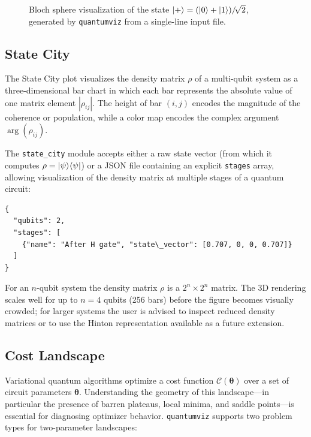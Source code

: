 \documentclass{SciPost}
\begin{document}
\begin{figure}[h]
\centering
{}
\caption{Bloch sphere visualization of the state
         $\ket{+} = (\ket{0}+\ket{1})/\!\sqrt{2}$,
         generated by \texttt{quantumviz} from a single-line input file.}
\label{fig:bloch}
\end{figure}

\subsection{State City}

The State City plot visualizes the density matrix $\rho$ of a multi-qubit
system as a three-dimensional bar chart in which each bar represents the
absolute value of one matrix element $|\rho_{ij}|$.
The height of bar $(i,j)$ encodes the magnitude of the coherence or
population, while a color map encodes the complex argument
$\arg(\rho_{ij})$.

The \texttt{state\_city} module accepts either a raw state vector (from which
it computes $\rho = \ket{\psi}\!\bra{\psi}$) or a JSON file containing an
explicit \texttt{stages} array, allowing visualization of the density matrix
at multiple stages of a quantum circuit:

\begin{lstlisting}
{
  "qubits": 2,
  "stages": [
    {"name": "After H gate", "state\_vector": [0.707, 0, 0, 0.707]}
  ]
}
\end{lstlisting}

For an $n$-qubit system the density matrix $\rho$ is a $2^n \times 2^n$
matrix.
The 3D rendering scales well for up to $n = 4$ qubits (256 bars) before the
figure becomes visually crowded; for larger systems the user is advised to
inspect reduced density matrices or to use the Hinton representation
available as a future extension.

\subsection{Cost Landscape}

Variational quantum algorithms optimize a cost function $\mathcal{C}(\boldsymbol{\theta})$
over a set of circuit parameters $\boldsymbol{\theta}$.
Understanding the geometry of this landscape---in particular the presence of
barren plateaus, local minima, and saddle points---is essential for
diagnosing optimizer behavior.
\texttt{quantumviz} supports two problem types for two-parameter landscapes:
\end{document}
